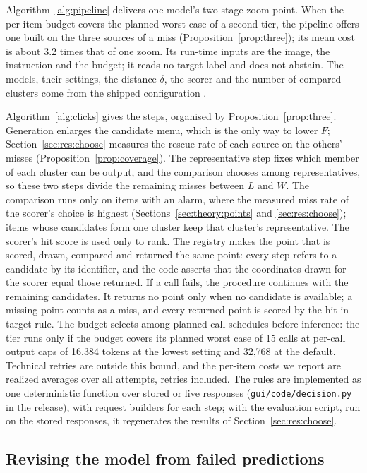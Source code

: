 Algorithm~\ref{alg:pipeline} delivers one model's two-stage zoom point. When the per-item budget covers the planned worst case of a second tier, the pipeline offers one built on the three sources of a miss (Proposition~\ref{prop:three}); its mean cost is about 3.2 times that of one zoom. Its run-time inputs are the image, the instruction and the budget; it reads no target label and does not abstain. The models, their settings, the distance $\delta$, the scorer and the number of compared clusters come from the shipped configuration .



Algorithm~\ref{alg:clicks} gives the steps, organised by Proposition~\ref{prop:three}. Generation enlarges the candidate menu, which is the only way to lower $F$; Section~\ref{sec:res:choose} measures the rescue rate of each source on the others' misses (Proposition~\ref{prop:coverage}). The representative step fixes which member of each cluster can be output, and the comparison chooses among representatives, so these two steps divide the remaining misses between $L$ and $W$. The comparison runs only on items with an alarm, where the measured miss rate of the scorer's choice is highest (Sections~\ref{sec:theory:points} and \ref{sec:res:choose}); items whose candidates form one cluster keep that cluster's representative. The scorer's hit score is used only to rank. The registry makes the point that is scored, drawn, compared and returned the same point: every step refers to a candidate by its identifier, and the code asserts that the coordinates drawn for the scorer equal those returned. If a call fails, the procedure continues with the remaining candidates. It returns no point only when no candidate is available; a missing point counts as a miss, and every returned point is scored by the hit-in-target rule. The budget selects among planned call schedules before inference: the tier runs only if the budget covers its planned worst case of 15 calls at per-call output caps of 16,384 tokens at the lowest setting and 32,768 at the default. Technical retries are outside this bound, and the per-item costs we report are realized averages over all attempts, retries included. The rules are implemented as one deterministic function over stored or live responses (\texttt{gui/code/decision.py} in the release), with request builders for each step; with the evaluation script, run on the stored responses, it regenerates the results of Section~\ref{sec:res:choose}.

\subsection{Revising the model from failed predictions}\label{sec:method:revise}

